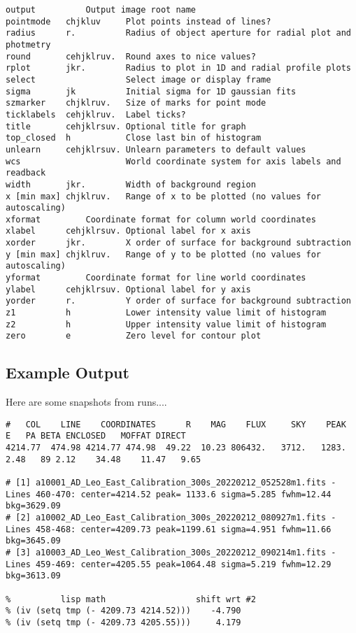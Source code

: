 \begin{verbatim}
output			Output image root name
pointmode   chjkluv     Plot points instead of lines?
radius      r.          Radius of object aperture for radial plot and photmetry
round       cehjklruv.  Round axes to nice values?
rplot       jkr.        Radius to plot in 1D and radial profile plots
select                  Select image or display frame
sigma       jk          Initial sigma for 1D gaussian fits
szmarker    chjklruv.   Size of marks for point mode
ticklabels  cehjklruv.  Label ticks?
title       cehjklrsuv. Optional title for graph
top_closed  h           Close last bin of histogram
unlearn     cehjklrsuv. Unlearn parameters to default values
wcs                     World coordinate system for axis labels and readback
width       jkr.        Width of background region
x [min max] chjklruv.   Range of x to be plotted (no values for autoscaling)
xformat			Coordinate format for column world coordinates
xlabel      cehjklrsuv. Optional label for x axis
xorder      jkr.        X order of surface for background subtraction
y [min max] chjklruv.   Range of y to be plotted (no values for autoscaling)
yformat			Coordinate format for line world coordinates
ylabel      cehjklrsuv. Optional label for y axis
yorder      r.          Y order of surface for background subtraction
z1          h           Lower intensity value limit of histogram
z2          h           Upper intensity value limit of histogram
zero        e           Zero level for contour plot
\end{verbatim}
\endgroup


\subsection{Example Output}

Here are some snapshots from runs....

\begingroup \fontsize{10pt}{10pt}
\selectfont
\begin{verbatim} 
#   COL    LINE    COORDINATES      R    MAG    FLUX     SKY    PEAK    E   PA BETA ENCLOSED   MOFFAT DIRECT
4214.77  474.98 4214.77 474.98  49.22  10.23 806432.   3712.   1283. 2.48   89 2.12    34.48    11.47   9.65

# [1] a10001_AD_Leo_East_Calibration_300s_20220212_052528m1.fits - 
Lines 460-470: center=4214.52 peak= 1133.6 sigma=5.285 fwhm=12.44 bkg=3629.09
# [2] a10002_AD_Leo_East_Calibration_300s_20220212_080927m1.fits - 
Lines 458-468: center=4209.73 peak=1199.61 sigma=4.951 fwhm=11.66 bkg=3645.09
# [3] a10003_AD_Leo_West_Calibration_300s_20220212_090214m1.fits - 
Lines 459-469: center=4205.55 peak=1064.48 sigma=5.219 fwhm=12.29 bkg=3613.09

%          lisp math                  shift wrt #2
% (iv (setq tmp (- 4209.73 4214.52)))    -4.790
% (iv (setq tmp (- 4209.73 4205.55)))     4.179

\end{verbatim}
\endgroup

